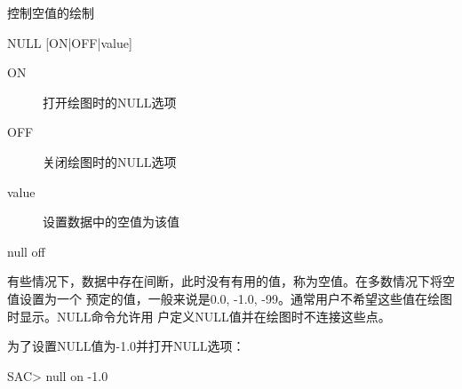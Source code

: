 \label{cmd:null}

控制空值的绘制

\begin{SACSTX}
NULL [ON|OFF|value]
\end{SACSTX}

\begin{description}
\item [ON] 打开绘图时的NULL选项 
\item [OFF] 关闭绘图时的NULL选项 
\item [value] 设置数据中的空值为该值
\end{description}

\begin{SACDFT}
null off
\end{SACDFT}

有些情况下，数据中存在间断，此时没有有用的值，称为空值。在多数情况下将空值设置为一个
预定的值，一般来说是0.0, -1.0, -99。通常用户不希望这些值在绘图时显示。NULL命令允许用
户定义NULL值并在绘图时不连接这些点。

为了设置NULL值为-1.0并打开NULL选项：
\begin{SACCode}
SAC> null on -1.0
\end{SACCode}
